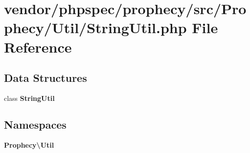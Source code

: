 \section{vendor/phpspec/prophecy/src/\+Prophecy/\+Util/\+String\+Util.php File Reference}
\label{_string_util_8php}
\subsection*{Data Structures}
\begin{DoxyCompactItemize}
\item 
class {\bf String\+Util}
\end{DoxyCompactItemize}
\subsection*{Namespaces}
\begin{DoxyCompactItemize}
\item 
 {\bf Prophecy\textbackslash{}\+Util}
\end{DoxyCompactItemize}

